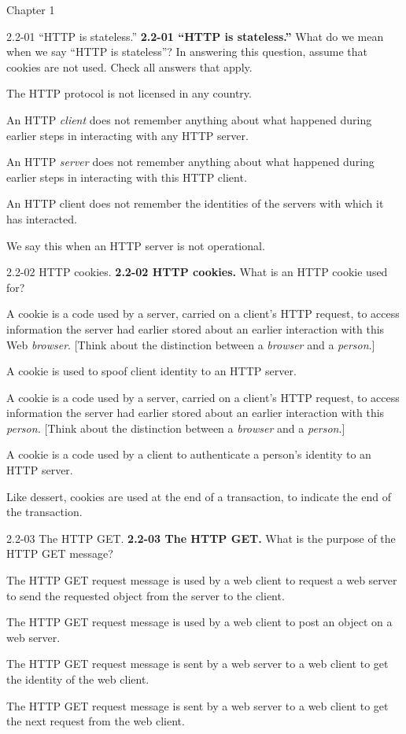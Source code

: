 \documentclass[a4paper]{article}
\begin{document}
\begin{quiz}{Chapter 1}
\begin{multi}[points=1,shuffle,multiple]{2.2-01 “HTTP is stateless.”}
\textbf{2.2-01 “HTTP is stateless.” } What do we mean when we say “HTTP is stateless”? In answering this question, assume that cookies are not used.  Check all answers that apply.
\item The HTTP protocol is not licensed in any country.
\item An HTTP \emph{client} does not remember anything about what happened during earlier steps in interacting with any HTTP server.
\item* An HTTP \emph{server} does not remember anything about what happened during earlier steps in interacting with this HTTP client.
\item An HTTP client does not remember the identities of the servers with which  it has interacted.
\item We say this when an HTTP server is not operational.
\end{multi}

\begin{multi}[points=1,shuffle]{2.2-02 HTTP cookies.}
\textbf{2.2-02 HTTP cookies. } What is an HTTP cookie used for?
\item* A cookie is a code used by a server, carried on a client’s HTTP request, to access information the server had earlier stored about an earlier interaction with this Web \emph{browser}. [Think about the distinction between a \emph{browser} and a \emph{person}.]
\item A cookie is used to spoof client identity to an HTTP server.
\item A cookie is a code used by a server, carried on a client’s HTTP request, to access information the server had earlier stored about an earlier interaction with this \emph{person. }[Think about the distinction between a \emph{browser} and a \emph{person}.]\emph{}
\item A cookie is a code used by a client to authenticate a person’s identity to an HTTP server.
\item Like dessert, cookies are used at the end of a transaction, to indicate the end of the transaction.
\end{multi}

\begin{multi}[points=1,shuffle]{2.2-03 The HTTP GET.}
\textbf{2.2-03 The HTTP GET.}  What is the purpose of the HTTP GET message?
\item* The HTTP GET request message is used by a web client to request a web server to send the requested object from the server to the client.
\item The HTTP GET request message is used by a web client to post an object on a web server.
\item The HTTP GET request message is sent by a web server to a web client to get the identity of the web client.
\item The HTTP GET request message is sent by a web server to a web client to get the next request from the web client.
\end{multi}


\end{quiz}
\end{document}
